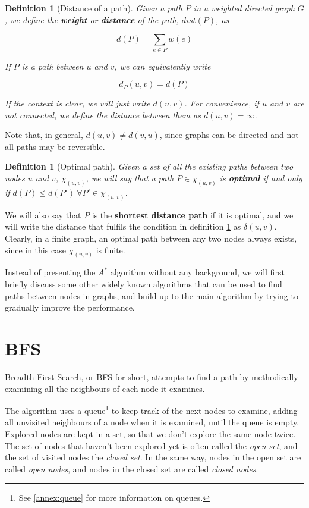 \documentclass[a4paper,10pt]{report}
\newtheorem{definition}[theorem]{Definition}
\begin{document}
\begin{definition}[Distance of a path]
Given a path $P$ in a weighted directed graph $G$, we define the \textbf{weight} or \textbf{distance} of the path, $dist(P)$, as

\[ d(P) = \sum_{e \in P} w(e) \]

If $P$ is a path between $u$ and $v$, we can equivalently write

\[ d_P(u, v) = d(P) \]

If the context is clear, we will just write $d(u, v)$. For convenience, if $u$ and $v$ are not connected, we define the distance between them as $d(u, v) = \infty$.
\end{definition}

Note that, in general, $d(u, v) \neq d(v, u)$, since graphs can be directed and not all paths may be reversible.

\begin{definition}[Optimal path]
\label{def:optimal}
Given a set of all the existing paths between two nodes $u$ and $v$, $\chi_{(u, v)}$, we will say that a path $P \in \chi_{(u,v)}$ is \textbf{optimal} if and only if $d(P) \le d(P') \ \forall P' \in \chi_{(u, v)}$.
\end{definition}

We will also say that $P$ is the \textbf{shortest distance path} if it is optimal, and we will write the distance that fulfils the condition in definition \ref{def:optimal} as $\delta(u,v)$. Clearly, in a finite graph, an optimal path between any two nodes always exists, since in this case $\chi_{(u, v)}$ is finite.

Instead of presenting the $A^*$ algorithm without any background, we will first briefly discuss some other widely known algorithms that can be used to find paths between nodes in graphs, and build up to the main algorithm by trying to gradually improve the performance.

\section{BFS}
Breadth-First Search, or BFS for short, attempts to find a path by methodically examining all the neighbours of each node it examines.

The algorithm uses a queue\footnote{See \ref{annex:queue} for more information on queues.} to keep track of the next nodes to examine, adding all unvisited neighbours of a node when it is examined, until the queue is empty. Explored nodes are kept in a set, so that we don't explore the same node twice. The set of nodes that haven't been explored yet is often called the \emph{open set}, and the set of visited nodes the \emph{closed set}. In the same way, nodes in the open set are called \emph{open nodes}, and nodes in the closed set are called \emph{closed nodes}.
\end{document}
